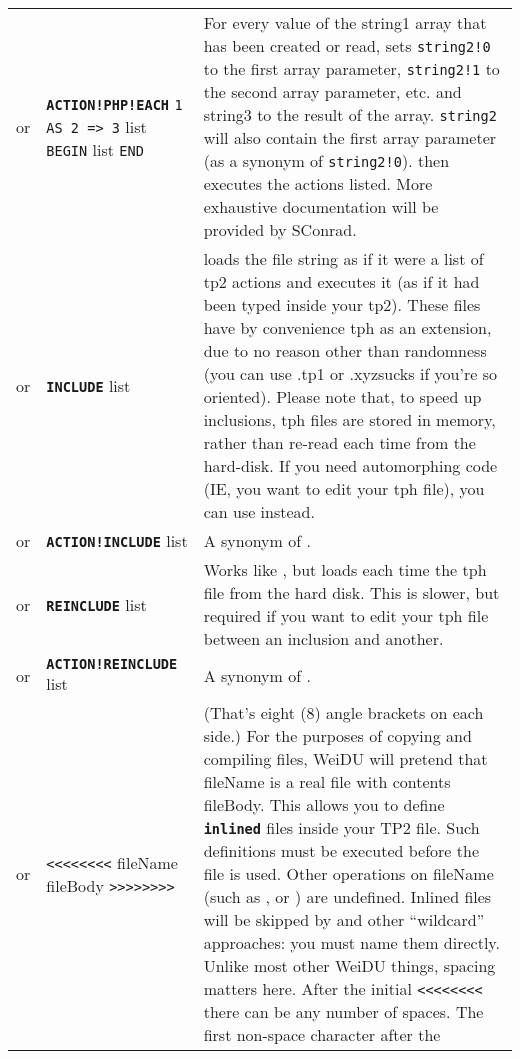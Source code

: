 \documentclass{article}
\def\ttref#1{\ahrefloc{#1}{\tt #1}}
\def\DEFINE#1{{\tt \bf #1}\label{#1}\index{#1}}
\def\t#1{{\tt #1}}
\def\Slist{{\color{red} list }}
\begin{document}
\begin{tabular}{cp{10in}|p{10in}}
or & \DEFINE{ACTION!PHP!EACH} \t{\ttref{String}1 AS \ttref{String}2 => \ttref{String}3} \Slist
                              \t{BEGIN} \ttref{TP2 Action} \Slist \t{END} &
    For every value of the string1 array that has been created or read, sets
    \verb+string2!0+ to the first array parameter, \verb+string2!1+ to the second array
    parameter, etc. and string3 to the result of the array. \verb+string2+ will also contain
		the first array parameter (as a synonym of \verb+string2!0+). then executes the
    actions listed. More exhaustive documentation will be provided by SConrad.
\\

or & \DEFINE{INCLUDE} \t{\ttref{String}} \Slist & 
    loads the file string as if it were a list of tp2 actions and executes it (as if
		it had been typed inside your tp2).
    These files have by convenience tph as an extension, due to no reason other than
    randomness (you can use .tp1 or .xyzsucks if you're so oriented).
		Please note that, to speed up inclusions, tph files are stored in memory,
	  rather than re-read each time from the hard-disk. If you need automorphing code
		(IE, you want to edit your tph file), you can use \ttref{REINCLUDE} instead. \\
or & \DEFINE{ACTION!INCLUDE} \t{\ttref{String}} \Slist &
    A synonym of \ttref{INCLUDE}.
\\
or & \DEFINE{REINCLUDE} \t{\ttref{String}} \Slist &
    Works like \ttref{INCLUDE}, but loads each time the tph file from the hard disk.
    This is slower, but required if you want to edit your tph file between an
    inclusion and another.
    \\
or & \DEFINE{ACTION!REINCLUDE} \t{\ttref{String}} \Slist &
    A synonym of \ttref{INCLUDE}.
    \\
  or & \t{<<<<<<<<} fileName fileBody \t{>>>>>>>>} &
    (That's eight (8) angle brackets on each side.)
    For the purposes of copying and compiling files, WeiDU will pretend
    that fileName is a real file with contents fileBody. This allows you to
    define \DEFINE{inlined} files inside your TP2 file. Such definitions
    must be executed before the \ttref{inlined} file is used. Other operations
    on fileName (such as \ttref{FILE!EXISTS}, \ttref{FILE!MD5} or
    \ttref{FILE!SIZE}) are undefined. Inlined files will be skipped by
    \ttref{COPY!EXISTING!REGEXP} and other ``wildcard'' approaches: you
    must name them directly. Unlike most other WeiDU things,
    spacing matters here. After the initial \t{<<<<<<<<} there can be
    any number of spaces. The first non-space character after the

\end{tabular}
\end{document}
